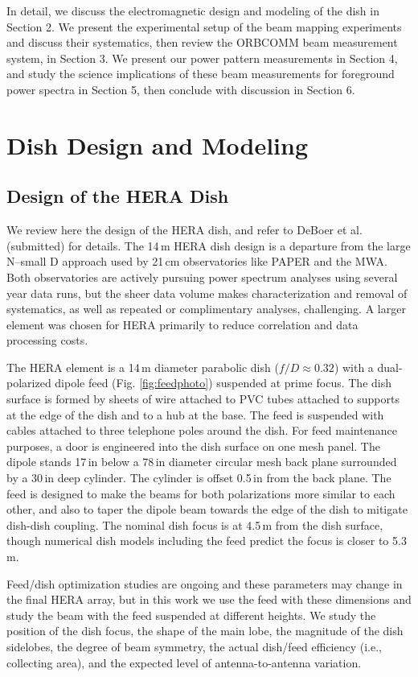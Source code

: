 \documentclass{emulateapj}
\begin{document}
In detail, we discuss the electromagnetic design and modeling of the dish in Section 2. We present the 
experimental setup of the beam mapping experiments and discuss their systematics, then 
review the ORBCOMM beam measurement system, in Section 3. We present our power pattern 
measurements in Section 4, and study the science implications of these beam measurements for foreground power spectra in Section 5, then conclude with discussion in Section 6.

\section{Dish Design and Modeling}

\subsection{Design of the HERA Dish}

We review here the design of the HERA dish, and refer to DeBoer et al. (submitted) for details. 
The 14\,m HERA dish design is a departure from the large N--small D approach used by 21\,cm 
observatories like PAPER and the MWA. Both observatories are actively pursuing power 
spectrum analyses using several year data runs, but the sheer data volume makes 
characterization and removal of systematics, as well as repeated or complimentary analyses, 
challenging. A larger element was chosen for HERA primarily to reduce correlation and data processing costs. 

The HERA element is a 14\,m diameter parabolic dish ($f/D\approx0.32$) with a dual-polarized dipole feed (Fig. \ref{fig:feedphoto}) suspended at prime focus. The dish surface is formed by sheets of wire attached to PVC tubes attached to supports at the edge of the dish and to a hub at the base. The feed is suspended with cables attached to three telephone poles around the dish. For feed maintenance purposes, a door is engineered into the dish surface on one mesh panel. The dipole stands 17\,in below a 78\,in diameter circular mesh back plane surrounded by a 30\,in deep cylinder. The cylinder is offset 0.5\,in from the back plane. The feed is designed to make the beams for both polarizations more similar to each other, and also to taper the dipole beam towards the edge of the dish to mitigate dish-dish coupling.  The nominal dish focus is at 4.5\,m from the dish surface, though numerical dish models including the feed predict the focus is closer to 5.3\,m. 

Feed/dish optimization studies are ongoing and these parameters may change in the final HERA array, but in this work we use the feed with these dimensions and study the beam with the feed suspended at different heights. We study the position of the dish focus, the shape of the main lobe, the magnitude of the dish sidelobes, the degree of beam symmetry, the actual dish/feed efficiency (i.e., collecting area), and the expected level of antenna-to-antenna variation.
\end{document}
